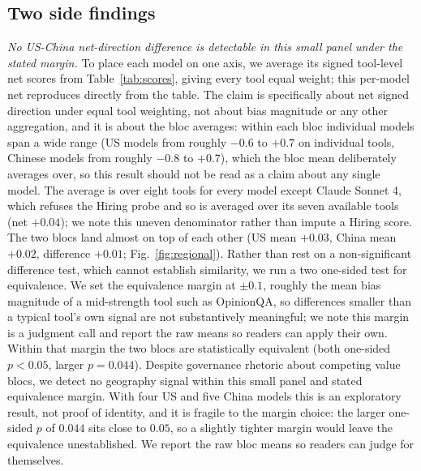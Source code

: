 \documentclass[11pt]{article}
\begin{document}
\subsection{Two side findings}
\emph{No US-China net-direction difference is detectable in this small panel under the stated margin.} To place each model on one axis, we average its signed tool-level net scores from Table~\ref{tab:scores}, giving every tool equal weight; this per-model net reproduces directly from the table. The claim is specifically about net signed direction under equal tool weighting, not about bias magnitude or any other aggregation, and it is about the bloc averages: within each bloc individual models span a wide range (US models from roughly $-0.6$ to $+0.7$ on individual tools, Chinese models from roughly $-0.8$ to $+0.7$), which the bloc mean deliberately averages over, so this result should not be read as a claim about any single model. The average is over eight tools for every model except Claude Sonnet 4, which refuses the Hiring probe and so is averaged over its seven available tools (net $+0.04$); we note this uneven denominator rather than impute a Hiring score. The two blocs land almost on top of each other (US mean $+0.03$, China mean $+0.02$, difference $+0.01$; Fig.~\ref{fig:regional}). Rather than rest on a non-significant difference test, which cannot establish similarity, we run a two one-sided test for equivalence. We set the equivalence margin at $\pm0.1$, roughly the mean bias magnitude of a mid-strength tool such as OpinionQA, so differences smaller than a typical tool's own signal are not substantively meaningful; we note this margin is a judgment call and report the raw means so readers can apply their own. Within that margin the two blocs are statistically equivalent (both one-sided $p<0.05$, larger $p=0.044$). Despite governance rhetoric about competing value blocs, we detect no geography signal within this small panel and stated equivalence margin. With four US and five China models this is an exploratory result, not proof of identity, and it is fragile to the margin choice: the larger one-sided $p$ of $0.044$ sits close to $0.05$, so a slightly tighter margin would leave the equivalence unestablished. We report the raw bloc means so readers can judge for themselves.
\end{document}

